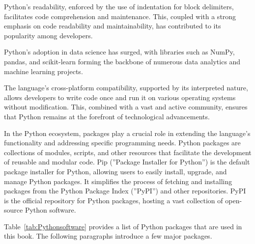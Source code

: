 \begin{withcode}
Python's readability, enforced by the use of indentation for block delimiters, facilitates code comprehension and maintenance. This, coupled with a strong emphasis on code readability and maintainability, has contributed to its popularity among developers.

Python's adoption in data science has surged, with libraries such as NumPy, pandas, and scikit-learn forming the backbone of numerous data analytics and machine learning projects.

The language's cross-platform compatibility, supported by its interpreted nature, allows developers to write code once and run it on various operating systems without modification. This, combined with a vast and active community, ensures that Python remains at the forefront of technological advancements.

In the Python ecosystem, packages play a crucial role in extending the language's functionality and addressing specific programming needs. Python packages are collections of modules, scripts, and other resources that facilitate the development of reusable and modular code. Pip (''Package Installer for Python'') is the default package installer for Python, allowing users to easily install, upgrade, and manage Python packages. It simplifies the process of fetching and installing packages from the Python Package Index (''PyPI'') and other repositories. PyPI is the official repository for Python packages, hosting a vast collection of open-source Python software. 

Table~\ref{tab:Pythonsoftware} provides a list of Python packages that are used in this book. The following paragraphs introduce a few major packages.

\begin{table}
\small
\centering


\end{table}
\end{withcode}
